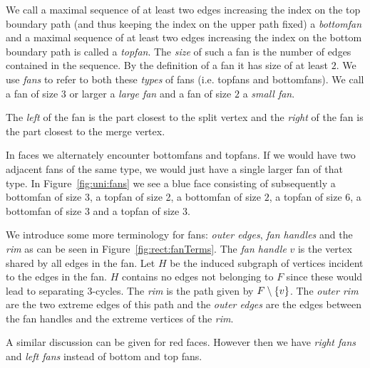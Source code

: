     We call a maximal sequence of at least two edges increasing the index on the top boundary path (and thus keeping the index on the upper path fixed) a \emph{bottomfan} and a maximal sequence of at least two edges increasing the index on the bottom boundary path is called a \emph{topfan}.
    The \emph{size} of such a fan is the number of edges contained in the sequence. By the definition of a fan it has size of at least $2$.
    We use \emph{fans} to refer to both these \emph{types} of fans (i.e. topfans and bottomfans).
    We call a fan of size $3$ or larger a \emph{large fan} and a fan of size $2$ a \emph{small fan}.

    The \emph{left} of the fan is the part closest to the split vertex and the \emph{right} of the fan is the part closest to the merge vertex.

    In faces we alternately encounter bottomfans and topfans. If we would have two adjacent fans of the same type, we would just have a single larger fan of that type.
    In Figure~\ref{fig:uni:fans} we see a blue face consisting of subsequently a bottomfan of size $3$, a topfan of size 2, a bottomfan of size $2$, a topfan of size $6$, a bottomfan of size $3$ and a topfan of size $3$.

   We introduce some more terminology for fans: \emph{outer edges}, \emph{fan handles} and the \emph{rim} as can be seen in Figure~\ref{fig:rect:fanTerms}. The \emph{fan handle} $v$ is the vertex shared by all edges in the fan. Let $H$ be the induced subgraph of vertices incident to the edges in the fan. $H$ contains no edges not belonging to $F$ since these would lead to separating 3-cycles. The \emph{rim} is the path given by $F\setminus \left\lbrace {v} \right\rbrace$.
   The \emph{outer rim} are the two extreme edges of this path and the \emph{outer edges} are the edges between the fan handles and the extreme vertices of the \emph{rim}.

   A similar discussion can be given for red faces. However then we have \emph{right fans} and \emph{left fans} instead of bottom and top fans.


